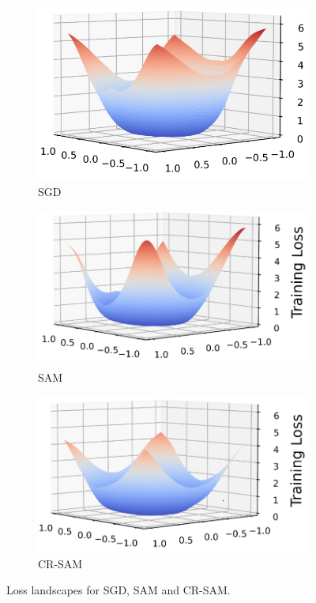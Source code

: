 \documentclass[letterpaper]{article} %
\theoremstyle{plain}
\theoremstyle{definition}
\begin{document}
\begin{figure}[h]

    \centering
    \begin{subfigure}[b]{0.27\linewidth}
        \centering
        \includegraphics[width=0.8\linewidth]{figs/SGD_loss.png}
        \caption{SGD}
        \label{fig:sgd}
    \end{subfigure}
    \hfill
    \begin{subfigure}[b]{0.3\linewidth}
        \centering
        \includegraphics[width=0.8\linewidth]{figs/SAM_loss.png}
        \caption{SAM}
        \label{fig:sam}
    \end{subfigure}
    \hfill
    \begin{subfigure}[b]{0.3\linewidth}
        \centering
        \includegraphics[width=0.8\linewidth]{figs/CRSAM_loss.png}
        \caption{CR-SAM}
        \label{fig:sam-GAM}
    \end{subfigure}
    \caption{Loss landscapes for SGD, SAM and CR-SAM.}
    \label{fig:vis}
\end{figure}
\end{document}
